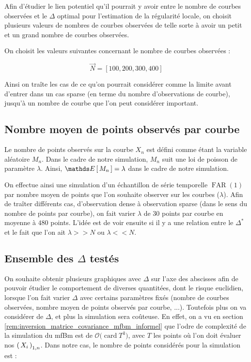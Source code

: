 Afin d'étudier le lien potentiel qu'il pourrait y avoir entre le nombre de courbes observées et le $\Delta$ optimal pour l'estimation de la régularité locale, on choisit plusieurs valeurs de nombres de courbes observées de telle sorte à avoir un \og petit \fg et un \og grand \fg nombre de courbes observées.

On choisit les valeurs suivantes concernant le nombre de courbes observées :

$$
	\vec N = [ 100, 200, 300, 400]
$$

Ainsi on traîte les cas de ce qu'on pourrait considérer comme la limite avant d'entrer dans un cas \og sparse \fg (en terme du nombre d'observations de courbe), jusqu'à un nombre de courbe que l'on peut considérer important.

\subsection{Nombre moyen de points observés par courbe}

Le nombre de points observés sur la courbe $X_n$ est défini comme étant la variable aléatoire $M_n$. Dans le cadre de notre simulation, $M_n$ suit une loi de poisson de paramètre $\lambda$. Ainsi, $\esperance{M_n} = \lambda$ dans le cadre de notre simulation.

On effectue ainsi une simulation d'un échantillon de série temporelle $\operatorname{FAR}(1)$ par nombre moyen de points que l'on souhaite observer sur les courbes ($\lambda$). Afin de traîter différents cas, d'observation \og dense \fg à observation \og sparse \fg (dans le sens du nombre de points par courbe), on fait varier $\lambda$ de $30$ points par courbe en moyenne à $480$ points. L'idée est de voir ensuite si il y a une relation entre le $\Delta^*$ et le fait que l'on ait $\lambda >> N$ ou $\lambda << N$.

\subsection{Ensemble des $\Delta$ testés}

On souhaite obtenir plusieurs graphiques avec $\Delta$ sur l'axe des abscisses afin de pouvoir étudier le comportement de diverses quantitées, dont le risque euclidien, lorsque l'on fait varier $\Delta$ avec certains paramètres fixés (nombre de courbes observées, nombre moyen de points observés par courbe, ...). Toutefois plus on va considérer de $\Delta$, et plus la simulation sera coûteuse. En effet, on a vu en section \ref{rem:inversion_matrice_covariance_mfbm_informel} que l'odre de complexité de la simulation du mfBm est de $\mathcal O \bigl( \operatorname{card} T^3 \bigr)$, avec $T$ les points où l'on doit évaluer nos $\left( \, {X} _ {i} \, \right)_{1, n}$. Dans notre cas, le nombre de points considérés pour la simulation est :

